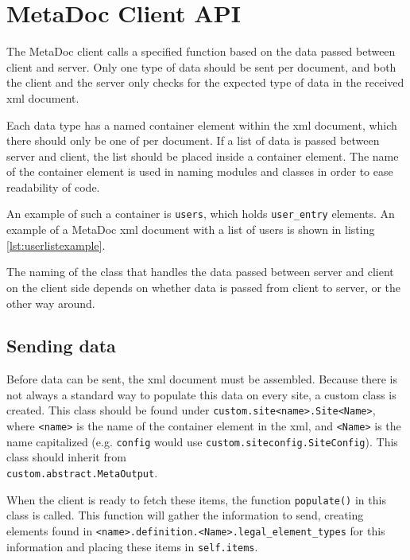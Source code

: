 \newpage
\section{MetaDoc Client API}
\label{sec:client_api}

The MetaDoc client calls a specified function based on the data passed between
client and server. Only one type of data should be sent per document, and both
the client and the server only checks for the expected type of data in the
received \gls{xml} document. 

Each data type has a named container element within the \gls{xml} document,
which there should only be one of per document. If a list of data is passed
between server and client, the list should be placed inside a container
element. The name of the container element is used in naming modules and
classes in order to ease readability of code. 

An example of such a container is \texttt{users}, which holds
\texttt{user\_entry} elements. An example of a MetaDoc \gls{xml} document with
a list of users is shown in listing \ref{lst:userlistexample}.


The naming of the class that handles the data passed between server and client
on the client side depends on whether data is passed from client to server, or
the other way around. 

\subsection{Sending data}
\label{sec:customizing_client_send}
Before data can be sent, the \gls{xml} document must be assembled. Because
there is not always a standard way to populate this data on every site, a
custom class is created. This class should be found under
\texttt{custom.site<name>.Site<Name>}, where \texttt{<name>} is the name of the
container element in the \gls{xml}, and \texttt{<Name>} is the name capitalized
(e.g.  \texttt{config} would use \texttt{custom.siteconfig.SiteConfig}). This
class should inherit from \\ \texttt{custom.abstract.MetaOutput}. 

When the client is ready to fetch these items, the function \texttt{populate()}
in this class is called. This function will gather the information to send,
creating elements found in
\texttt{<name>.definition.<Name>.legal\_element\_types} for this information
and placing these items in \texttt{self.items}. 

